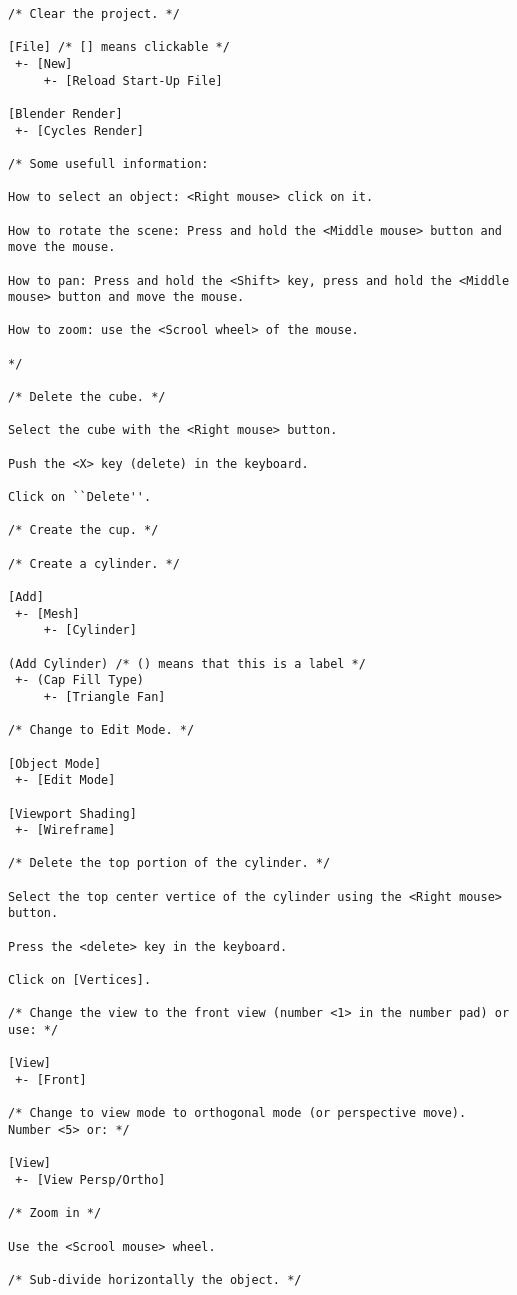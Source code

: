\begin{verbatim}
/* Clear the project. */

[File] /* [] means clickable */
 +- [New]
     +- [Reload Start-Up File]

[Blender Render]
 +- [Cycles Render]

/* Some usefull information:

How to select an object: <Right mouse> click on it.

How to rotate the scene: Press and hold the <Middle mouse> button and move the mouse.

How to pan: Press and hold the <Shift> key, press and hold the <Middle mouse> button and move the mouse.

How to zoom: use the <Scrool wheel> of the mouse.

*/

/* Delete the cube. */

Select the cube with the <Right mouse> button.

Push the <X> key (delete) in the keyboard.

Click on ``Delete''.

/* Create the cup. */

/* Create a cylinder. */

[Add]
 +- [Mesh]
     +- [Cylinder]

(Add Cylinder) /* () means that this is a label */
 +- (Cap Fill Type)
     +- [Triangle Fan]

/* Change to Edit Mode. */

[Object Mode]
 +- [Edit Mode]

[Viewport Shading]
 +- [Wireframe]

/* Delete the top portion of the cylinder. */

Select the top center vertice of the cylinder using the <Right mouse> button.

Press the <delete> key in the keyboard.

Click on [Vertices].

/* Change the view to the front view (number <1> in the number pad) or use: */

[View]
 +- [Front]

/* Change to view mode to orthogonal mode (or perspective move). Number <5> or: */

[View]
 +- [View Persp/Ortho]

/* Zoom in */

Use the <Scrool mouse> wheel.

/* Sub-divide horizontally the object. */


\end{verbatim}
